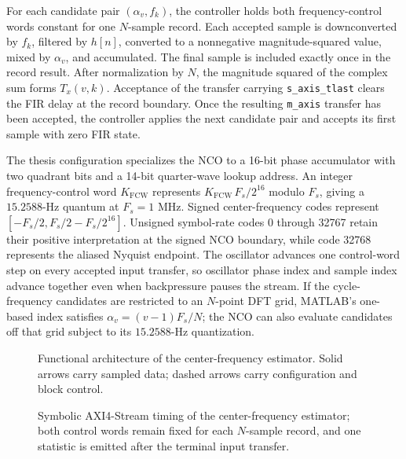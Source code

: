 For each candidate pair $(\alpha_v,f_k)$, the controller holds both frequency-control words constant for one $N$-sample record.  Each accepted sample is downconverted by $f_k$, filtered by $h[n]$, converted to a nonnegative magnitude-squared value, mixed by $\alpha_v$, and accumulated.  The final sample is included exactly once in the record result.  After normalization by $N$, the magnitude squared of the complex sum forms $T_x(v,k)$.  Acceptance of the transfer carrying \texttt{s\_axis\_tlast} clears the FIR delay at the record boundary.  Once the resulting \texttt{m\_axis} transfer has been accepted, the controller applies the next candidate pair and accepts its first sample with zero FIR state.

The thesis configuration specializes the NCO to a 16-bit phase accumulator with two quadrant bits and a 14-bit quarter-wave lookup address.  An integer frequency-control word $K_{\mathrm{FCW}}$ represents $K_{\mathrm{FCW}}\,F_s/2^{16}$ modulo $F_s$, giving a $15.2588$-Hz quantum at $F_s=1\text{ MHz}$.  Signed center-frequency codes represent $[-F_s/2,F_s/2-F_s/2^{16}]$.  Unsigned symbol-rate codes 0 through 32767 retain their positive interpretation at the signed NCO boundary, while code 32768 represents the aliased Nyquist endpoint.  The oscillator advances one control-word step on every accepted input transfer, so oscillator phase index and sample index advance together even when backpressure pauses the stream.  If the cycle-frequency candidates are restricted to an $N$-point DFT grid, MATLAB's one-based index satisfies $\alpha_v=(v-1)F_s/N$; the NCO can also evaluate candidates off that grid subject to its $15.2588$-Hz quantization.

\begin{figure}[H]
\begin{center}
\resizebox{\textwidth}{!}{}
\caption{Functional architecture of the center-frequency estimator. Solid arrows carry sampled data; dashed arrows carry configuration and block control.}
\label{fig:cfe}
\end{center}
\end{figure}

\begin{figure}[H]
\begin{center}
\resizebox{0.96\textwidth}{!}{}
\caption[Center-frequency-estimator timing.]{Symbolic AXI4-Stream timing of the center-frequency estimator; both control words remain fixed for each $N$-sample record, and one statistic is emitted after the terminal input transfer.}
\label{fig:center_frequency_timing}
\end{center}
\end{figure}

